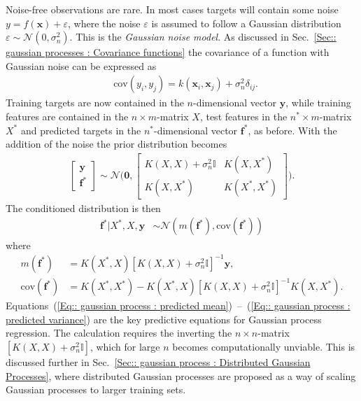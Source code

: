 \documentclass[twoside,english]{uiofysmaster}
\begin{document}
{Noise-free observations are rare. In most cases targets will contain some noise $y = f(\textbf{x}) + \varepsilon$, where the noise $\varepsilon$ is assumed to follow a Gaussian distribution $\varepsilon \sim \mathcal{N}(0, \sigma_n^2)$. This is the \textit{Gaussian noise model}. As discussed in Sec.~\ref{Sec:: gaussian processes : Covariance functions} the covariance of a function with Gaussian noise can be expressed as
\begin{align}
&\text{cov}(y_i, y_j) = k(\textbf{x}_i, \textbf{x}_j) + \sigma_n^2 \delta_{ij}.
\end{align}
Training targets are now contained in the $n$-dimensional vector $\textbf{y}$, while training features are contained in the $n \times m$-matrix $X$, test features in the $n^* \times m$-matrix $X^*$ and predicted targets in the $n^*$-dimensional vector $\textbf{f}^*$, as before. With the addition of the noise the prior distribution becomes
\begin{align}
\begin{bmatrix}
\textbf{y}\\
\textbf{f}^*
\end{bmatrix}
\sim 
\mathcal{N} \Bigg(
\boldsymbol{0},
\begin{bmatrix}
K(X, X) + \sigma_n^2 \mathbb{I} & K(X, X^*)\\
K(X, X^*) & K(X^*, X^*)
\end{bmatrix}
 \Bigg).
\end{align}
The conditioned distribution is then 
\begin{align}
\textbf{f}^* \big| X^*, X, \textbf{y} & \sim \mathcal{N}(m(\textbf{f}^*), \text{cov}(\textbf{f}^*))
\end{align}
where
\begin{align}
m(\textbf{f}^*) &= K(X^*, X) [K(X, X) + \sigma_n^2 \mathbb{I}]^{-1} \textbf{y},\label{Eq:: gaussian process : predicted mean}\\ 
\text{cov} (\textbf{f}^*) &= K(X^*, X^*) - K(X^*, X)[K(X, X) + \sigma_n^2 \mathbb{I}]^{-1} K(X, X^*). \label{Eq:: gaussian process : predicted variance}
\end{align}
Equations~(\ref{Eq:: gaussian process : predicted mean})~--~(\ref{Eq:: gaussian process : predicted variance}) are the key predictive equations for Gaussian process regression. The calculation requires the inverting the $n \times n$-matrix $[K(X,X) + \sigma_n^2 \mathbb{I}]$, which for large $n$ becomes computationally unviable. This is discussed further in Sec.~\ref{Sec:: gaussian process : Distributed Gaussian Processes}, where distributed Gaussian processes are proposed as a way of scaling Gaussian processes to larger training sets.

}
\end{document}
